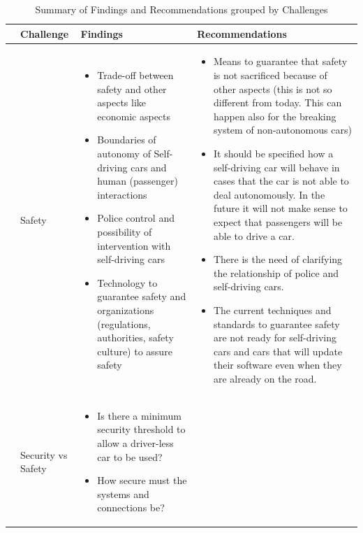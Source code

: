 \begin{table}
	\centering
	\caption{Summary of Findings and Recommendations grouped by Challenges}
	\label{tab:Findings}
	\begin{small}
		\begin{supertabular}{>{}p{.02\textwidth}|>{\raggedright}p{.105\textwidth}>{\raggedright}p{.4\textwidth}>{\raggedright}p{.4\textwidth}}
			\toprule
			 & {Challenge} & {Findings} & {Recommendations}  \tabularnewline
			\midrule
			 &Safety & 
					\begin{itemize}
					\item Trade-off between safety and other aspects like economic aspects
					\item Boundaries of autonomy of Self-driving cars and human (passenger) interactions
					\item Police control and possibility of intervention with self-driving cars
					\item Technology to guarantee safety and organizations (regulations, authorities, safety culture) to assure safety
					\end{itemize}
 			& 
					\begin{itemize}
					\item Means to guarantee that safety is not sacrificed because of other aspects (this is not so different from today. This can happen also for the breaking system of non-autonomous cars)
					\item It should be specified how a self-driving car will behave in cases that the car is not able to deal autonomously. In the future it will not make sense to expect that passengers will be able to drive a car. 
					\item There is the need of clarifying the relationship of police and self-driving cars.
					\item The current techniques and standards to guarantee safety are not ready for self-driving cars and cars that will update their software even when they are already on the road.
					\end{itemize} 			
 			 \tabularnewline {}
			& Security vs Safety & 
					\begin{itemize}
					\item Is there a minimum security threshold to allow a driver-less car to be used?
					\item How secure must the systems and connections be?

\end{itemize}
\end{supertabular}
\end{small}
\end{table}
